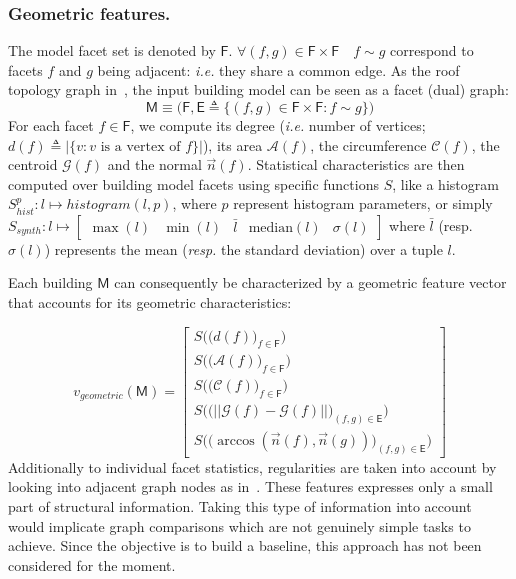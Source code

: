\documentclass[runningheads]{llncs}
\begin{document}
\subsubsection{Geometric features.}
The model facet set is denoted by $\mathsf{F}$. $\forall (f, g) \in \mathsf{F} \times \mathsf{F} \quad f \sim g$ correspond to facets $f$ and $g$ being adjacent: \textit{i.e.} they share a common edge. As the roof topology graph in~\cite{Verma2006}, the input building model can be seen as a facet (dual) graph:
\begin{equation}
	\label{eq::model_graph}
	\mathsf{M} \equiv \Big(\mathsf{F}, \mathsf{E} \triangleq \big\{ (f, g) \in \mathsf{F} \times \mathsf{F} : f \sim g \big\} \Big)
\end{equation}
For each facet $f \in \mathsf{F}$, we compute its degree (\textit{i.e.} number of vertices; $d(f) \triangleq \vert\{v : v\text{ is a vertex of }f\}\vert$), its area $\mathscr{A}(f)$, the circumference $\mathscr{C}(f)$, the centroid $\mathscr{G}(f)$ and the normal $\vec{n}(f)$. Statistical characteristics are then computed over building model facets using specific functions $S$, like a histogram $S^p_{hist}: l \mapsto histogram(l, p)$, where $p$ represent histogram parameters, or simply $S_{synth}: l \mapsto \begin{bmatrix}
\max(l)& \min(l) & \bar{l} & \text{median}(l) & \sigma(l)
\end{bmatrix}$ where $\bar{l}$ (resp. $\sigma(l)$) represents the mean (\textit{resp.} the standard deviation) over a tuple $l$.

Each building $\mathsf{M}$ can consequently be characterized by a geometric feature vector that accounts for its geometric characteristics:

\begin{equation}
	\label{eq::geom_feat}
    v_{geometric}(\mathsf{M}) = \begin{bmatrix}
    	S \Big(\big(d(f)\big)_{f \in \mathsf{F}}\Big)\\
    	S \Big(\big(\mathscr{A}(f)\big)_{f \in \mathsf{F}}\Big)\\
    	S \Big(\big(\mathscr{C}(f)\big)_{f \in \mathsf{F}}\Big)\\
    	S \Big(\big( \vert\vert \mathscr{G}(f) - \mathscr{G}(f) \vert\vert \big)_{(f,g) \in \mathsf{E}}\Big)\\
    	S\Big(\big( \arccos(\vec{n}(f), \vec{n}(g)) \big)_{(f,g) \in \mathsf{E}}\Big)
    \end{bmatrix}
\end{equation}
Additionally to individual facet statistics, regularities are taken into account by looking into adjacent graph nodes as in~\cite{Zhou2012}. These features expresses only a small part of structural information. Taking this type of information into account would implicate graph comparisons which are not genuinely simple tasks to achieve. Since the objective is to build a baseline, this approach has not been considered for the moment.
\end{document}
